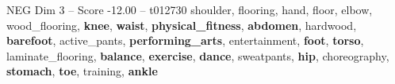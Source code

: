 \begin{textsample}{NEG Dim 3 – Score -12.00 – t012730}  \label{ex:f3_neg_028}
shoulder, flooring, hand, floor, elbow, wood\_flooring, \textbf{knee}, \textbf{waist}, \textbf{physical\_fitness}, \textbf{abdomen}, hardwood, \textbf{barefoot}, active\_pants, \textbf{performing\_arts}, entertainment, \textbf{foot}, \textbf{torso}, laminate\_flooring, \textbf{balance}, \textbf{exercise}, \textbf{dance}, sweatpants, \textbf{hip}, choreography, \textbf{stomach}, \textbf{toe}, training, \textbf{ankle}

\end{textsample}
